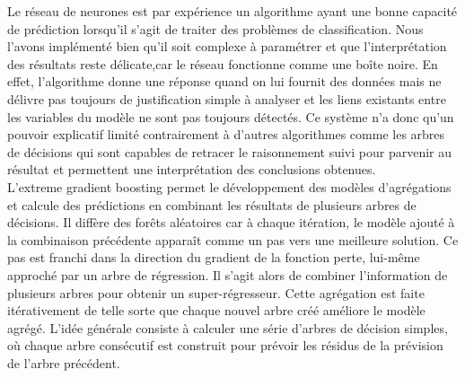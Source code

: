 Le réseau de neurones est par expérience un algorithme ayant une bonne capacité de prédiction  lorsqu’il  s’agit  de  traiter  des  problèmes  de  classification.  Nous  l’avons implémenté bien qu’il soit complexe à paramétrer et que l’interprétation des résultats reste  délicate,car  le  réseau  fonctionne  comme  une  boîte  noire. En effet, l’algorithme donne une réponse quand on lui fournit des données mais ne délivre pas toujours de justification simple à analyser et les liens existants entre les variables du modèle ne sont pas toujours détectés. Ce système n'a donc qu'un pouvoir explicatif limité contrairement à d'autres algorithmes comme les arbres de décisions qui sont capables de retracer le raisonnement  suivi  pour  parvenir  au  résultat  et  permettent  une  interprétation  des conclusions obtenues.\\

L’extreme gradient boosting permet le développement des modèles d’agrégations et calcule des prédictions en combinant les résultats de plusieurs arbres de décisions. Il diffère des forêts aléatoires car à chaque itération, le modèle ajouté à la combinaison précédente apparaît comme un pas vers une meilleure solution. Ce pas est franchi dans la direction du gradient de la fonction perte, lui-même approché par un arbre de régression. Il s’agit alors de combiner l’information de plusieurs arbres pour obtenir un super-régresseur.  Cette  agrégation  est  faite  itérativement  de  telle  sorte  que  chaque  nouvel arbre créé améliore le modèle agrégé. L’idée générale consiste  à  calculer  une  série d’arbres de décision simples, où chaque arbre consécutif est construit pour prévoir les résidus de la prévision de l’arbre précédent.

